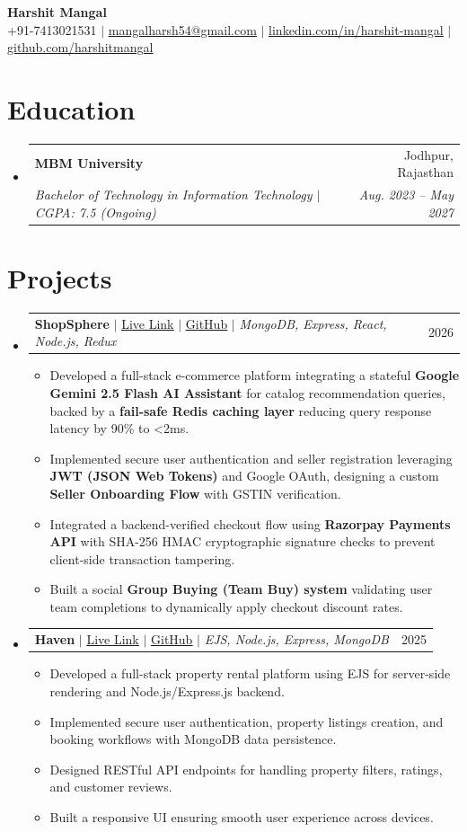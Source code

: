 \documentclass[letterpaper,11pt]{article}
\makeatletter
\newcommand{\resumeItem}[1]{
  \item\small{
    {#1 \vspace{-2pt}}
  }
}
\newcommand{\resumeSubheading}[4]{
  \vspace{-2pt}\item
    \begin{tabular*}{\textwidth}[t]{l@{\extracolsep{\fill}}r}
      \textbf{#1} & #2 \\
      \textit{\small#3} & \textit{\small #4} \\
    \end{tabular*}\vspace{-7pt}
}
\newcommand{\resumeProjectHeading}[2]{
    \item
    \begin{tabular*}{\textwidth}{l@{\extracolsep{\fill}}r}
      \small#1 & #2 \\
    \end{tabular*}\vspace{-7pt}
}
\newcommand{\resumeSubHeadingListStart}{\begin{itemize}[leftmargin=0.0in, label={}]}
\newcommand{\resumeSubHeadingListEnd}{\end{itemize}}
\newcommand{\resumeItemListStart}{\begin{itemize}}
\newcommand{\resumeItemListEnd}{\end{itemize}\vspace{-5pt}}
\makeatother
\begin{document}
\begin{center}
    \textbf{\Huge Harshit Mangal} \\ \vspace{3pt}
    \small +91-7413021531 $|$ 
    \href{mailto:mangalharsh54@gmail.com}{\underline{mangalharsh54@gmail.com}} $|$ 
    \href{https://linkedin.com/in/harshit-mangal}{\underline{linkedin.com/in/harshit-mangal}} $|$ 
    \href{https://github.com/harshitmangal}{\underline{github.com/harshitmangal}}
\end{center}


\section{Education}
  \resumeSubHeadingListStart
    \resumeSubheading
      {MBM University}{Jodhpur, Rajasthan}
      {Bachelor of Technology in Information Technology $|$ CGPA: 7.5 (Ongoing)}{\textnormal{Aug. 2023 -- May 2027}}
  \resumeSubHeadingListEnd


\section{Projects}
  \resumeSubHeadingListStart
    \resumeProjectHeading
      {\textbf{ShopSphere} $|$ \href{https://flipcart-clone-mu.vercel.app/}{\underline{Live Link}} $|$ \href{https://github.com/HarshitMangal/Flipcart-Clone}{\underline{GitHub}} $|$ \emph{MongoDB, Express, React, Node.js, Redux}}{2026}
      \resumeItemListStart
        \resumeItem{Developed a full-stack e-commerce platform integrating a stateful \textbf{Google Gemini 2.5 Flash AI Assistant} for catalog recommendation queries, backed by a \textbf{fail-safe Redis caching layer} reducing query response latency by 90\% to <2ms.}
        \resumeItem{Implemented secure user authentication and seller registration leveraging \textbf{JWT (JSON Web Tokens)} and Google OAuth, designing a custom \textbf{Seller Onboarding Flow} with GSTIN verification.}
        \resumeItem{Integrated a backend-verified checkout flow using \textbf{Razorpay Payments API} with SHA-256 HMAC cryptographic signature checks to prevent client-side transaction tampering.}
        \resumeItem{Built a social \textbf{Group Buying (Team Buy) system} validating user team completions to dynamically apply checkout discount rates.}
      \resumeItemListEnd

    \resumeProjectHeading
      {\textbf{Haven} $|$ \href{https://major-project-wht3.onrender.com/}{\underline{Live Link}} $|$ \href{https://github.com/HarshitMangal/major_project}{\underline{GitHub}} $|$ \emph{EJS, Node.js, Express, MongoDB}}{2025}
      \resumeItemListStart
        \resumeItem{Developed a full-stack property rental platform using EJS for server-side rendering and Node.js/Express.js backend.}
        \resumeItem{Implemented secure user authentication, property listings creation, and booking workflows with MongoDB data persistence.}
        \resumeItem{Designed RESTful API endpoints for handling property filters, ratings, and customer reviews.}
        \resumeItem{Built a responsive UI ensuring smooth user experience across devices.}
      \resumeItemListEnd
  \resumeSubHeadingListEnd
\end{document}
